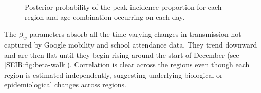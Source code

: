 \documentclass[thesis.tex]{subfiles}
\begin{document}
\begin{figure}
    \caption[Posterior estimates of peak incidence timing]{%
        Posterior probability of the peak incidence proportion for each region and age combination occurring on each day.
    }
    \label{SEIR:fig:peak-incidence}
\end{figure}

The $\beta_w$ parameters absorb all the time-varying changes in transmission not captured by Google mobility and school attendance data.
They trend downward and are then flat until they begin rising around the start of December (see \cref{SEIR:fig:beta-walk}).
Correlation is clear across the regions even though each region is estimated independently, suggesting underlying biological or epidemiological changes across regions.
\end{document}

